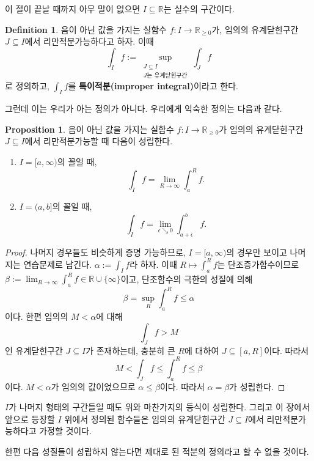 \documentclass[11pt]{book}
\numberwithin{equation}{chapter}
\def\RR{\mathbb{R}}
\def\eps{\epsilon}
\theoremstyle{definition}
\newtheorem{prop}[thm]{Proposition}
\newtheorem{defn}[thm]{Definition}
\newenvironment{enum}
	{\begin{enumerate}[label=(\alph*), leftmargin=2\parindent]}
	{\end{enumerate}}
\begin{document}
이 절이 끝날 때까지 아무 말이 없으면 \(I \subseteq \RR\)는 실수의 구간이다.

\begin{defn} \label{13.1.1}
    음이 아닌 값을 가지는 실함수 \(f : I \to \RR_{\ge 0}\)가, 임의의 유계닫힌구간 \(J \subseteq I\)에서 리만적분가능하다고 하자. 이때
    \[
    \int_I f := \sup_{\substack{J \subseteq I \\ J \text{는 유계닫힌구간}}} \int_J f
    \]
    로 정의하고, \(\int_I f\)를 \textbf{특이적분(improper integral)}이라고 한다.
\end{defn}

그런데 이는 우리가 아는 정의가 아니다. 우리에게 익숙한 정의는 다음과 같다.

\begin{prop} \label{13.1.2}
    음이 아닌 값을 가지는 실함수 \(f : I \to \RR_{\ge 0}\)가 임의의 유계닫힌구간 \(J \subseteq I\)에서 리만적분가능할 때 다음이 성립한다.
    \begin{enum}
        \item \(I = [a, \infty)\)의 꼴일 때,
        \[
        \int_I f = \lim_{R \to \infty} \int_a^R f.
        \]
        \item \(I = (a, b]\)의 꼴일 때,
        \[
            \int_I f = \lim_{\eps \searrow 0} \int_{a+\eps}^b f.
        \]
    \end{enum}
\end{prop}
\begin{proof}
    나머지 경우들도 비슷하게 증명 가능하므로, \(I = [a, \infty)\)의 경우만 보이고 나머지는 연습문제로 남긴다. \(\alpha := \int_I f\)라 하자. 이때 \(R \mapsto \int_a^R f\)는 단조증가함수이므로 \(\beta := \lim_{R \to \infty} \int_a^R f \in \RR \cup \{\infty\}\)이고, 단조함수의 극한의 성질에 의해
    \[
    \beta = \sup_R \int_a^R f \le \alpha   
    \]
    이다. 한편 임의의 \(M < \alpha\)에 대해
    \[
    \int_J f > M    
    \]
    인 유계닫힌구간 \(J \subseteq I\)가 존재하는데, 충분히 큰 \(R\)에 대하여 \(J \subseteq [a, R]\)이다. 따라서
    \[
    M < \int_J f \le \int_a^R f \le \beta
    \]
    이다. \(M < \alpha\)가 임의의 값이었으므로 \(\alpha \le \beta\)이다. 따라서 \(\alpha = \beta\)가 성립한다.
\end{proof}

\(I\)가 나머지 형태의 구간들일 때도 위와 마찬가지의 등식이 성립한다. 그리고 이 장에서 앞으로 등장할 \(I\) 위에서 정의된 함수들은 임의의 유계닫힌구간 \(J \subseteq I\)에서 리만적분가능하다고 가정할 것이다.

한편 다음 성질들이 성립하지 않는다면 제대로 된 적분의 정의라고 할 수 없을 것이다.
\end{document}

